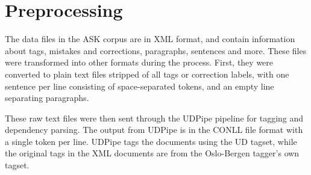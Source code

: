 
\section{Preprocessing}

The data files in the ASK corpus are in XML format, and contain information
about tags, mistakes and corrections, paragraphs, sentences and more. These
files were transformed into other formats during the process. First, they were
converted to plain text files stripped of all tags or correction labels, with
one sentence per line consisting of space-separated tokens, and an empty line
separating paragraphs.

These raw text files were then sent through the UDPipe pipeline for tagging and
dependency parsing. The output from UDPipe is in the CONLL file format with
a single token per line. UDPipe tags the documents using the UD tagset, while
the original tags in the XML documents are from the Oslo-Bergen tagger's own
tagset.
